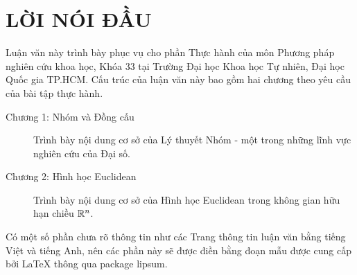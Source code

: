 \chapter*{LỜI NÓI ĐẦU}

Luận văn này trình bày phục vụ cho phần Thực hành của môn Phương pháp nghiên cứu khoa học, Khóa 33 tại Trường Đại học Khoa học Tự nhiên, Đại học Quốc gia TP.HCM. Cấu trúc của luận văn này bao gồm hai chương theo yêu cầu của bài tập thực hành.

\begin{description}
\item [Chương 1: Nhóm và Đồng cấu ] Trình bày nội dung cơ sở của Lý thuyết Nhóm - một trong những lĩnh vực nghiên cứu của Đại số.
\item [Chương 2: Hình học Euclidean] Trình bày nội dung cơ sở của Hình học Euclidean trong không gian hữu hạn chiều $\mathbb{R}^n$.
\end{description}

Có một số phần chưa rõ thông tin như các Trang thông tin luận văn bằng tiếng Việt và tiếng Anh, nên các phần này sẽ được điền bằng đoạn mẫu được cung cấp bởi \LaTeX{} thông qua package lipsum.